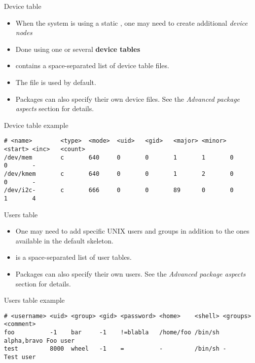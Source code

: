 \begin{frame}[fragile]{Device table}

  \begin{itemize}
  \item When the system is using a static , one may need to
    create additional {\em device nodes}
  \item Done using one or several {\bf device tables}
  \item {} contains a
    space-separated list of device table files.
  \item The  file is used by
    default.
  \item Packages can also specify their own device files. See the {\em
      Advanced package aspects} section for details.
  \end{itemize}

\begin{block}{Device table example}
{\tiny
\begin{verbatim}
# <name>        <type>  <mode>  <uid>   <gid>   <major> <minor> <start> <inc>   <count>
/dev/mem        c       640     0       0       1       1       0       0       -
/dev/kmem       c       640     0       0       1       2       0       0       -
/dev/i2c-       c       666     0       0       89      0       0       1       4
\end{verbatim}
}
\end{block}

\end{frame}

\begin{frame}[fragile]{Users table}
  \begin{itemize}
  \item One may need to add specific UNIX users and groups in addition
    to the ones available in the default skeleton.
  \item {} is a space-separated list of
    user tables.
  \item Packages can also specify their own users. See the {\em
      Advanced package aspects} section for details.
  \end{itemize}

\begin{block}{Users table example}
{\tiny
\begin{verbatim}
# <username> <uid> <group> <gid> <password> <home>    <shell> <groups>    <comment>
foo          -1    bar     -1    !=blabla   /home/foo /bin/sh alpha,bravo Foo user
test         8000  wheel   -1    =          -         /bin/sh -           Test user
\end{verbatim}
}
\end{block}

\end{frame}

